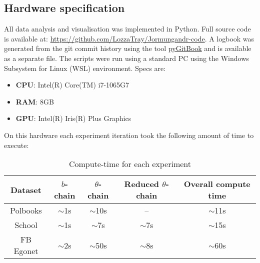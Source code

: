 \subsection{Hardware specification}
\label{appdx:imp-details}

All data analysis and visualisation was implemented in Python. Full source code is available at:
\url{https://github.com/LozzaTray/Jormungandr-code}. A logbook was generated from the git commit history using the tool \href{https://github.com/Hugoagogo/pyGitBook}{pyGitBook} and is available as a separate file.
The scripts were run using a standard PC using the Windows Subsystem for Linux (WSL) environment. Specs are:

\begin{itemize}
	\item \textbf{CPU}: Intel(R) Core(TM) i7-1065G7
	\item \textbf{RAM}: 8GB
	\item \textbf{GPU}: Intel(R) Iris(R) Plus Graphics
\end{itemize}

On this hardware each experiment iteration took the following amount of time to execute:

\begin{table}[!h]
	\centering
	\caption{Compute-time for each experiment}
	\label{tab:compute-time}
	\begin{tabular}{c|ccc|c}
		Dataset & $b$-chain & $\theta$-chain & Reduced $\theta$-chain & Overall compute time \\ \hline
		Polbooks & $\sim$1s & $\sim$10s & -- & $\sim$11s \\
		School & $\sim$1s & $\sim$7s & $\sim$7s & $\sim$15s \\
		FB Egonet & $\sim$2s & $\sim$50s & $\sim$8s & $\sim$60s
	\end{tabular}
\end{table}

